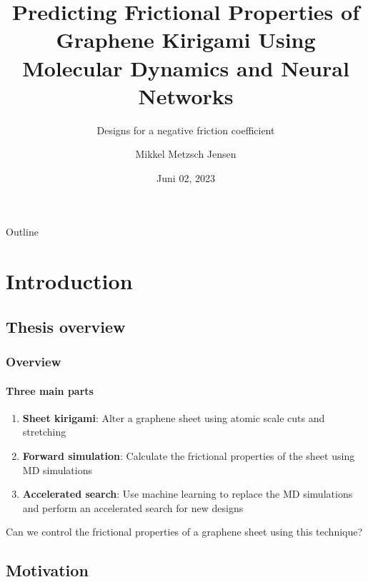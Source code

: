 \documentclass[UKenglish]{beamer}
\author[Mikkel Metzsch Jensen]{Mikkel Metzsch Jensen}
\title[Predicting Graphene Kirigami Friction]{Predicting Frictional Properties of Graphene Kirigami Using Molecular Dynamics and Neural Networks}
\subtitle{Designs for a negative friction coefficient}
\institute[UiO]{University of Oslo}
\date[Juni 02, 2023]{Juni 02, 2023}
\begin{document}
\begin{frame}{Outline}
    \tableofcontents
\end{frame}


\section{Introduction} %
\subsection{Thesis overview}

\begin{frame}[c]
	\frametitle{Overview}
	\framesubtitle{Three main parts}
	
	\begin{enumerate}
		\setlength\itemsep{1em}
		\item \textbf{Sheet kirigami}: Alter a graphene sheet using atomic scale cuts and stretching
		\item \textbf{Forward simulation}: Calculate the frictional properties of the sheet using MD simulations
		\item \textbf{Accelerated search}: Use machine learning to replace the MD simulations and perform an accelerated search for new designs
	\end{enumerate}
	\vspace{2mm}
	
	Can we control the frictional properties of a graphene sheet using this technique?
	
\end{frame}


\subsection{Motivation}
\end{document}

